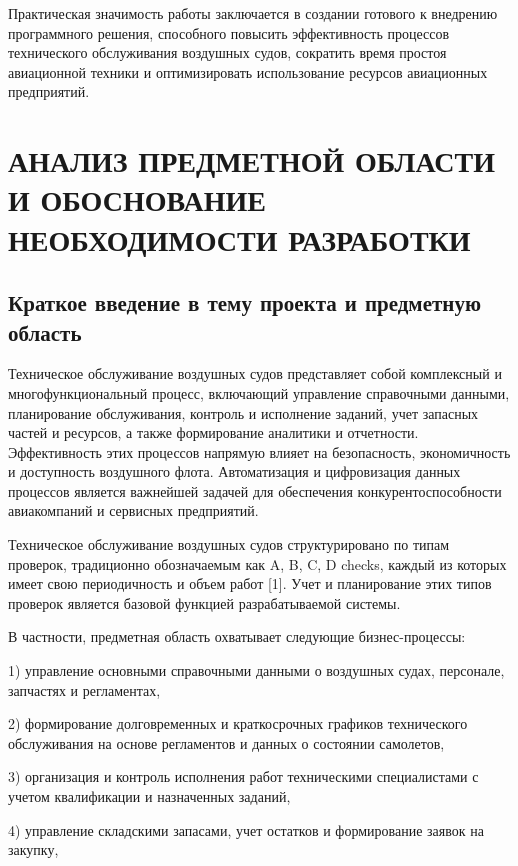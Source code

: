\documentclass[14pt,a4paper]{extarticle}
\begin{document}
Практическая значимость работы заключается в создании готового к внедрению программного решения, способного повысить эффективность процессов технического обслуживания воздушных судов, сократить время простоя авиационной техники и оптимизировать использование ресурсов авиационных предприятий.

\clearpage

\clearpage

\section{АНАЛИЗ ПРЕДМЕТНОЙ ОБЛАСТИ И ОБОСНОВАНИЕ НЕОБХОДИМОСТИ РАЗРАБОТКИ}

\subsection{Краткое введение в тему проекта и предметную область}

Техническое обслуживание воздушных судов представляет собой комплексный и многофункциональный процесс, включающий управление справочными данными, планирование обслуживания, контроль и исполнение заданий, учет запасных частей и ресурсов, а также формирование аналитики и отчетности. Эффективность этих процессов напрямую влияет на безопасность, экономичность и доступность воздушного флота. Автоматизация и цифровизация данных процессов является важнейшей задачей для обеспечения конкурентоспособности авиакомпаний и сервисных предприятий.

Техническое обслуживание воздушных судов структурировано по типам проверок, традиционно обозначаемым как A, B, C, D checks, каждый из которых имеет свою периодичность и объем работ [1]. Учет и планирование этих типов проверок является базовой функцией разрабатываемой системы.

В частности, предметная область охватывает следующие бизнес-процессы:

1) управление основными справочными данными о воздушных судах, персонале, запчастях и регламентах,

2) формирование долговременных и краткосрочных графиков технического обслуживания на основе регламентов и данных о состоянии самолетов,

3) организация и контроль исполнения работ техническими специалистами с учетом квалификации и назначенных заданий,

4) управление складскими запасами, учет остатков и формирование заявок на закупку,
\end{document}
